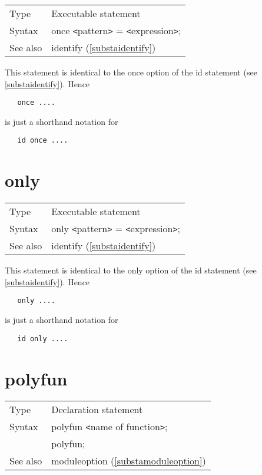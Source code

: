 \noindent \begin{tabular}{ll}
Type & Executable statement\\
Syntax & once {\tt<}pattern{\tt>} = {\tt<}expression{\tt>};
\\ See also & identify (\ref{substaidentify})
\end{tabular} \vspace{4mm}

\noindent This statement is identical to the once option of the 
id statement (see \ref{substaidentify}). Hence
\begin{verbatim}
   once ....
\end{verbatim}
is just a shorthand notation for
\begin{verbatim}
   id once ....
\end{verbatim}
\vspace{10mm}

 
\section{only}
\label{substaonly}

\noindent \begin{tabular}{ll}
Type & Executable statement\\
Syntax & only {\tt<}pattern{\tt>} = {\tt<}expression{\tt>};
\\ See also & identify (\ref{substaidentify})
\end{tabular} \vspace{4mm}

\noindent This statement is identical to the only option of the 
id statement (see \ref{substaidentify}). Hence
\begin{verbatim}
   only ....
\end{verbatim}
is just a shorthand notation for
\begin{verbatim}
   id only ....
\end{verbatim}
\vspace{10mm}


\section{polyfun}
\label{substapolyfun}

\noindent \begin{tabular}{ll}
Type & Declaration statement\\
Syntax & polyfun {\tt<}name of function{\tt>}; \\
       & polyfun;
\\ See also & moduleoption (\ref{substamoduleoption})
\end{tabular}\vspace{4mm}

